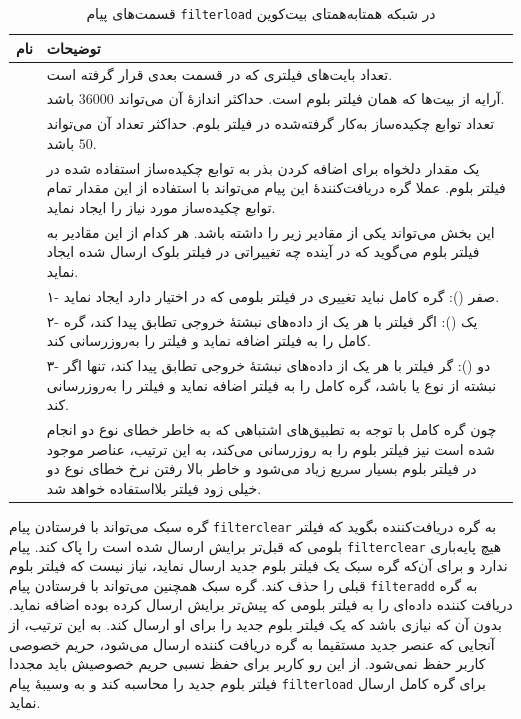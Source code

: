 \begin{xltabular}{\textwidth}{|c|X|}
	\caption{
		قسمت‌های پیام \texttt{filterload} در شبکه همتا‌به‌همتای بیت‌کوین
		\label{table:filterloadMessage}}\\
	\hline
	\textbf{نام} & {\textbf{توضیحات}} \\
	\hline \hline
	 &{%
تعداد بایت‌های فیلتری که در قسمت بعدی قرار گرفته است.	
}\\
\hline
	 &{%
	آر‌ایه از بیت‌ها که همان فیلتر بلوم است. حداکثر اندازهٔ آن می‌تواند $36000$ باشد.
}\\
\hline
	 &{%
	تعداد توابع چکیده‌ساز به‌کار گرفته‌شده در فیلتر بلوم. حداکثر تعداد آن می‌تواند $50$ باشد.
}\\
\hline
	 &{%
	یک مقدار دلخواه برای اضافه کردن بذر به توابع چکیده‌ساز استفاده شده در فیلتر بلوم. عملا گره دریافت‌کنندهٔ این پیام می‌تواند با استفاده از این مقدار تمام توابع چکیده‌ساز مورد نیاز را ایجاد نماید.
}\\
\hline
	 &{%
	این بخش می‌تواند یکی از مقادیر زیر را داشته باشد. هر کدام از این مقادیر به فیلتر بلوم می‌گوید که در آینده چه تغییراتی در فیلتر بلوک ارسال شده ایجاد نماید.
}\\
&{%
۱- صفر (): گره کامل نباید تغییری در فیلتر بلومی که در اختیار دارد ایجاد نماید.
}\\
&{%
۲- یک (): اگر فیلتر با هر یک از داده‌های نبشتهٔ خروجی تطابق پیدا کند، گره کامل  را به فیلتر اضافه نماید و فیلتر را به‌روزرسانی کند.
}\\
&{%
	۳- دو (): گر فیلتر با هر یک از داده‌های نبشتهٔ خروجی تطابق پیدا کند، تنها اگر نبشته از نوع  یا  باشد، گره کامل  را به فیلتر اضافه نماید و فیلتر را به‌روزرسانی کند.
}\\
&{%
	چون گره کامل با توجه به تطبیق‌های اشتباهی که به خاطر خطای نوع دو انجام شده است نیز فیلتر بلوم را به روزرسانی می‌کند، به این ترتیب، عناصر موجود در فیلتر بلوم بسیار سریع زیاد می‌شود و خاطر بالا رفتن نرخ خطای نوع دو خیلی زود فیلتر بلااستفاده خواهد شد.
}\\
\hline
	
\end{xltabular}

گره سبک می‌تواند با فرستادن پیام \texttt{filterclear} به گره دریافت‌کننده بگوید که فیلتر بلومی که قبل‌تر برایش ارسال شده است را پاک کند. پیام \texttt{filterclear} هیچ پایه‌باری ندارد و برای آن‌که گره سبک یک فیلتر بلوم جدید ارسال نماید، نیاز نیست که فیلتر بلوم قبلی را حذف کند. گره سبک همچنین می‌تواند با فرستادن پیام \texttt{filteradd} به گره دریافت کننده داده‌ای را به فیلتر بلومی که پیش‌تر برایش ارسال کرده بوده اضافه نماید. بدون آن که نیازی باشد که یک فیلتر بلوم جدید را برای او ارسال کند. به ‌این ترتیب،‌ از آنجایی که عنصر جدید مستقیما به گره دریافت کننده ارسال می‌شود، حریم خصوصی کاربر حفظ نمی‌شود. از این رو کاربر برای حفظ نسبی حریم خصوصیش باید مجددا فیلتر بلوم جدید را محاسبه کند و به وسیبهٔ پیام \texttt{filterload} برای گره کامل ارسال نماید.

